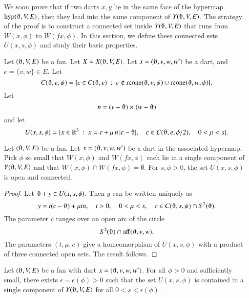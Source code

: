 
We soon prove that if two darts $x,y$ lie in the same
face of the hypermap $\op{hyp}(\orgn,V,E)$, then they lead
into the same component of $Y(\orgn,V,E)$.  The
strategy of the proof
is to construct a connected set inside $Y(\orgn,V,E)$
that runs from $W(x,\phi)$ to $W(f x,\phi)$.  
In this section, we define these connected sets $U(x,s,\phi)$
and study their basic properties.

Let $(\orgn,V,E)$ be a fan.  Let $X=X(\orgn,V,E)$. Let
$x=(\orgn,v,w,w')$ be a dart, and  $e = \{v,w\}\in E$.
Let 
  $$C(\orgn,e,\psi) =
    \{ c\in C(\orgn,e) \mid c\not\in \op{rcone}(\orgn,v,\psi)
    \cup\op{rcone}(\orgn,w,\psi)\}.
  $$
Let 
  $$n = (v-\orgn)\times (w-\orgn)$$
and let
  $$
  U(x,s,\phi) = \{ x  \in \ring{R}^3 \mid
     x = c + \mu\, n\, |c-\orgn|,\quad
     c\in C(\orgn,e,\phi/2),\quad
     0 < \mu < s
     \}.
  $$

\begin{lemma}  Let $(\orgn,V,E)$ be a fan.
Let $x=(\orgn,v,w,w')$ be a dart in the associated hypermap.
Pick $\phi$ so small that $W(x,\phi)$
and $W(f x,\phi)$ each lie in a single component 
of $Y(\orgn,V,E)$ and
that $W(x,\phi)\cap W(f x,\phi) =\emptyset$.
For $s,\phi > 0$, the set $U(x,s,\phi)$ is
open and connected.
\end{lemma}

\begin{proof}  Let $\orgn + y \in U(x,s,\phi)$.
Then $y$ can be written uniquely as
$$
  y = t (c - \orgn) + \mu t n,\quad
  t > 0,\quad
  0 < \mu < s,\quad
  c \in C(\orgn,s,\psi) \cap S^2(\orgn).
$$
The parameter $c$ ranges over an open arc of the circle
$$S^2(\orgn) \cap \op{aff}(\orgn,v,w).$$
The parameters $(t,\mu,c)$ give a homeomorphism of $U(x,s,\phi)$
with a product of three connected open sets.  The result follows.
\end{proof}



\begin{lemma}
Let $(\orgn,V,E)$ be a fan with dart
$x=(\orgn,v,w,w')$.
For all $\phi > 0$ and sufficiently small, there exists
$\epsilon=\epsilon(\phi)>0$ such that
the set $U(x,s,\phi)$ is
contained in a single component of $Y(\orgn,V,E)$ for all 
$0 < s <\epsilon(\phi)$.
\end{lemma}

